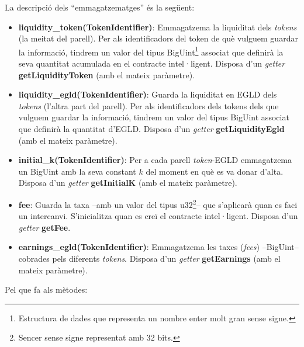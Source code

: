 \documentclass[11pt,a4paper]{article}
\begin{document}
La descripció dels ``emmagatzematges'' és la següent:
\begin{itemize}
\item \textbf{liquidity\_token(TokenIdentifier)}: Emmagatzema la liquiditat dels \textit{tokens} (la meitat del parell). Per als identificadors del token de què vulguem guardar la informació, tindrem un valor del tipus BigUint\footnote{Estructura de dades que representa un nombre enter molt gran sense signe.} associat que definirà la seva quantitat acumulada en el contracte intel·ligent. Disposa d'un \textit{getter} \textbf{getLiquidityToken} (amb el mateix paràmetre).
\item \textbf{liquidity\_egld(TokenIdentifier)}: Guarda la liquiditat en EGLD dels \textit{tokens} (l'altra part del parell). Per als identificadors dels tokens dels que vulguem guardar la informació, tindrem un valor del tipus BigUint associat que definirà la quantitat d'EGLD. Disposa d'un \textit{getter} \textbf{getLiquidityEgld} (amb el mateix paràmetre).
\item \textbf{initial\_k(TokenIdentifier)}: Per a cada parell \textit{token}-EGLD emmagatzema un BigUint amb la seva constant \(k\) del moment en què es va donar d'alta.  Disposa d'un \textit{getter} \textbf{getInitialK} (amb el mateix paràmetre).
\item \textbf{fee}: Guarda la taxa –amb un valor del tipus u32\footnote{Sencer sense signe representat amb 32 bits.}– que s'aplicarà quan es faci un intercanvi. S'inicialitza quan es creï el contracte intel·ligent. Disposa d'un \textit{getter} \textbf{getFee}.
\item \textbf{earnings\_egld(TokenIdentifier)}: Emmagatzema les taxes (\textit{fees}) –BigUint– cobrades pels diferents \textit{tokens}. Disposa d'un \textit{getter} \textbf{getEarnings} (amb el mateix paràmetre).
\end{itemize}
Pel que fa als mètodes:
\end{document}
